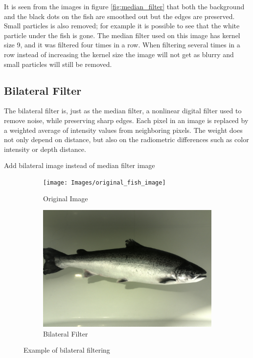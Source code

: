 It is seen from the images in figure \ref{fig:median_filter} that both the background and the black dots on the fish are smoothed out but the edges are preserved. Small particles is also removed; for example it is possible to see that the white particle under the fish is gone. The median filter used on this image has kernel size 9, and it was filtered four times in a row. When filtering several times in a row instead of increasing the kernel size the image will not get as blurry and small particles will still be removed.


\subsection{Bilateral Filter}
The bilateral filter is, just as the median filter, a nonlinear digital filter used to remove noise, while preserving sharp edges. Each pixel in an image is replaced by a weighted average of intensity values from neighboring pixels. The weight does not only depend on distance, but also on the radiometric differences such as color intensity or depth distance. 

{\color{red}Add bilateral image instead of median filter image}

\begin{figure}[h]
    \centering
    \begin{subfigure}{0.5\textwidth}
        \centering
        \texttt{[image: Images/original\_fish\_image]}
        \caption{Original Image}
    \end{subfigure}%
    \begin{subfigure}{.5\textwidth}
        \centering
        \includegraphics[width=.9\linewidth]{Images/median_filter}
        \caption{Bilateral Filter}
    \end{subfigure}
    \caption{Example of bilateral filtering}
    \label{fig:bilateral_filter}
\end{figure}

